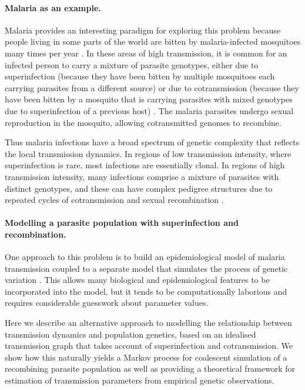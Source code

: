 \documentclass[_main.tex]{subfiles}
\begin{document}
\paragraph{Malaria as an example.} 

Malaria provides an interesting paradigm for exploring this problem because people living in some parts of the world are bitten by malaria-infected mosquitoes many times per year \cite{Smith2005,WHO2022}.  In these areas of high transmission, it is common for an infected person to carry a mixture of parasite genotypes, either due to superinfection (because they have been bitten by multiple mosquitoes each carrying parasites from a different source) or due to cotransmission (because they have been bitten by a mosquito that is carrying parasites with mixed genotypes due to superinfection of a previous host) \cite{Nkhoma2020}.  The malaria parasites undergo sexual reproduction in the mosquito, allowing cotransmitted genomes to recombine.

Thus malaria infections have a broad spectrum of genetic complexity that reflects the local transmission dynamics.  In regions of low transmission intensity, where superinfection is rare, most infections are essentially clonal.  In regions of high transmission intensity, many infections comprise a mixture of parasites with distinct genotypes, and these can have complex pedigree structures due to repeated cycles of cotransmission and sexual recombination \cite{Nkhoma2020}. 

\paragraph{Modelling a parasite population with superinfection and recombination.} 

One approach to this problem is to build an epidemiological model of malaria transmission coupled to a separate model that simulates the process of genetic variation \cite{Daniels2015,Watson2020,Hendry2021}.  This allows many biological and epidemiological features to be incorporated into the model, but it tends to be computationally laborious and requires considerable guesswork about parameter values.  

Here we describe an alternative approach to modelling the relationship between transmission dynamics and population genetics, based on an idealised transmission graph that takes account of superinfection and cotransmission.  We show how this naturally yields a Markov process for coalescent simulation of a recombining parasite population as well as providing a theoretical framework for estimation of transmission parameters from empirical genetic observations.  
\end{document}
